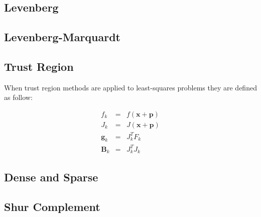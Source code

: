 \documentclass[peerreview,compsoc,onecolumn]{IEEEtran}
\begin{document}
\subsection{Levenberg}


\subsection{Levenberg-Marquardt}

\subsection{Trust Region}

When trust region methods are applied to least-squares problems they are defined as follow:

\begin{eqnarray}
f_k &=& f(\bm{x}+\bm{p}) \\
J_k &=& J(\bm{x}+\bm{p}) \\
\bm{g}_k &=& J^T_k F_k  \\
\bm{B}_k &=& J_k^T J_k
\end{eqnarray}


\subsection{Dense and Sparse}

\subsection{Shur Complement}



\end{document}
